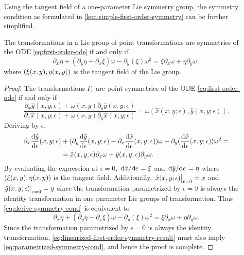Using the tangent field of a one-parameter Lie symmetry group, the symmetry condition as formulated in \cref{lem:simple-first-order-symmetry} can be further simplified.
\begin{lem} \label{lem:linearized-first-order-symmetry}
  The transformations in a Lie group of point transformations are symmetries of the ODE \ref{eq:first-order-ode} if and only if
  \begin{equation}
    \partial_x \eta + (\partial_y \eta - \partial_x \xi) \omega - \partial_y (\xi) \omega^2 =
    \xi \partial_x \omega + \eta \partial_y \omega,
  \end{equation}
  where \(\pqty{\xi(x,y), \eta(x,y)}\) is the tangent field of the Lie group.
\end{lem}
\begin{proof}
  The transformations \(\Gamma_\epsilon\) are point symmetries of the ODE \ref{eq:first-order-ode} if and only if
  \begin{equation} \label{eq:parametrized-symmetry-cond}
    \frac{\partial_x \hat{y}(x,y;\epsilon) + \omega(x,y) \partial_y \hat{y}(x,y;\epsilon)}{\partial_x \hat{x}(x,y;\epsilon) + \omega(x,y) \partial_y \hat{x}(x,y;\epsilon)} = \omega(\hat{x}(x,y;\epsilon),\hat{y}(x,y;\epsilon)).
  \end{equation}
  Deriving by \(\epsilon\),
  \begin{equation}
    \begin{split} \label{eq:derive-symmetry-cond}
      \partial_x \dv{\hat{y}}{\epsilon}{(x,y;\epsilon)} &+ (\partial_y \dv{\hat{y}}{\epsilon}{(x,y;\epsilon)} - \partial_x \dv{\hat{x}}{\epsilon}{(x,y;\epsilon)}) \omega - \partial_y (\dv{\hat{x}}{\epsilon}{(x,y;\epsilon)}) \omega^2 =\\
      &= \hat{x}(x,y;\epsilon) \partial_x \omega + \hat{y}(x,y;\epsilon) \partial_y \omega.
    \end{split}
  \end{equation}
  By evaluating the expression at \(\epsilon = 0\), \(\dv*{\hat{x}}{\epsilon} = \xi\) and \(\dv*{\hat{y}}{\epsilon} = \eta\) where \(\pqty{\xi(x,y), \eta(x,y)}\) is the tangent field.
  Additionally, \(\eval{\hat{x}(x,y;\epsilon)}_{\epsilon = 0} = x\) and \(\eval{\hat{y}(x,y;\epsilon)}_{\epsilon = 0} = y\) since the transformation parametrized by \(\epsilon = 0\) is always the identity transformation in one parameter Lie groups of transformation.
  Thus \cref{eq:derive-symmetry-cond} is equivalent to
  \begin{equation} \label{eq:linearized-first-order-symmetry-result}
    \partial_x \eta + (\partial_y \eta - \partial_x \xi) \omega - \partial_y (\xi) \omega^2 =
    \xi \partial_x \omega + \eta \partial_y \omega.
  \end{equation}
  Since the transformation parametrized by \(\epsilon = 0\) is always the identity transformation, \cref{eq:linearized-first-order-symmetry-result} must also imply \cref{eq:parametrized-symmetry-cond}, and hence the proof is complete.
\end{proof}

